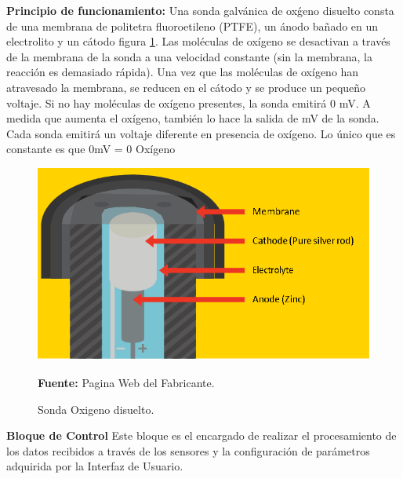 \textbf{Principio de funcionamiento:} Una sonda galv\'anica de ox\'geno disuelto consta de una membrana de politetra fluoroetileno (PTFE), un \'anodo ba\~nado en un electrolito y un c\'atodo figura \ref{fig:DO_prove}.
Las mol\'eculas de ox\'igeno se desactivan a trav\'es de la membrana de la sonda a una velocidad constante (sin la membrana, la reacci\'on es demasiado r\'apida). Una vez que las mol\'eculas de ox\'igeno han atravesado la membrana, se reducen en el c\'atodo y se produce un peque\~no voltaje. Si no hay mol\'eculas de ox\'igeno presentes, la sonda emitir\'a 0 mV. A medida que aumenta el oxígeno, también lo hace la salida de mV de la sonda. Cada sonda emitirá un voltaje diferente en presencia de oxígeno. Lo único que es constante es que 0mV = 0 Oxígeno
\begin{figure}[H]
    \centering
    \includegraphics[scale=1.5]{Imagenes/cap3/DO.png}
    \caption[Sonda Oxigeno disuelto]{Sonda Oxigeno disuelto.}{\textbf{Fuente: }Pagina Web del Fabricante\cite{atlas_scientific_lab_nodate}.}
    \label{fig:DO_prove}
\end{figure}

\textbf{Bloque de Control}
Este bloque es el encargado de realizar el procesamiento de los datos recibidos a través de los sensores y la configuración de parámetros adquirida por la Interfaz de Usuario.


